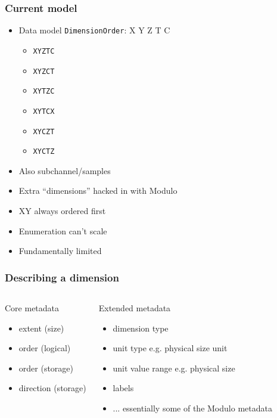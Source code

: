 \documentclass{beamer}
\begin{document}
\begin{frame}
  \frametitle{Current model}
  \begin{itemize}
  \item Data model \texttt{DimensionOrder}: X Y Z T C
    \begin{itemize}
      \item \texttt{XYZTC}
      \item \texttt{XYZCT}
      \item \texttt{XYTZC}
      \item \texttt{XYTCX}
      \item \texttt{XYCZT}
      \item \texttt{XYCTZ}
    \end{itemize}
    \pause
  \item Also subchannel/samples
  \item Extra ``dimensions'' hacked in with Modulo
  \item XY always ordered first
  \item Enumeration can't scale
  \item Fundamentally limited
  \end{itemize}
\end{frame}

\begin{frame}
  \frametitle{Describing a dimension}
  \begin{columns}[c]
    \begin{block}{Core metadata}
      \begin{itemize}
      \item extent (size)
        \pause
      \item order (logical)
        \pause
      \item order (storage)
      \item direction (storage)
      \end{itemize}
    \end{block}
    \pause
    \begin{block}{Extended metadata}
      \begin{itemize}
      \item dimension type
      \item unit type e.g. physical size unit
      \item unit value range e.g. physical size
      \item labels
      \item ... essentially some of the Modulo metadata
      \end{itemize}
    \end{block}
  \end{columns}
\end{frame}
\end{document}
